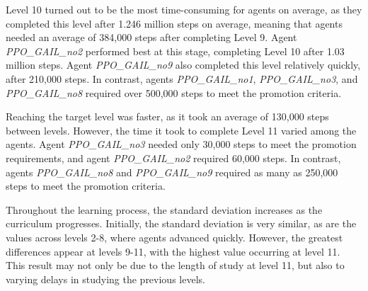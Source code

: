 Level 10 turned out to be the most time-consuming for agents on average, as they completed this level after 1.246 million steps on average, meaning that agents needed an average of 384,000 steps after completing Level 9. Agent \textit{PPO\_GAIL\_no2} performed best at this stage, completing Level 10 after 1.03 million steps. Agent \textit{PPO\_GAIL\_no9} also completed this level relatively quickly, after 210,000 steps. In contrast, agents \textit{PPO\_GAIL\_no1}, \textit{PPO\_GAIL\_no3}, and \textit{PPO\_GAIL\_no8} required over 500,000 steps to meet the promotion criteria.

Reaching the target level was faster, as it took an average of 130,000 steps between levels. However, the time it took to complete Level 11 varied among the agents. Agent \textit{PPO\_GAIL\_no3} needed only 30,000 steps to meet the promotion requirements, and agent \textit{PPO\_GAIL\_no2} required 60,000 steps. In contrast, agents \textit{PPO\_GAIL\_no8} and \textit{PPO\_GAIL\_no9} required as many as 250,000 steps to meet the promotion criteria.

Throughout the learning process, the standard deviation increases as the curriculum progresses. Initially, the standard deviation is very similar, as are the values across levels 2-8, where agents advanced quickly. However, the greatest differences appear at levels 9-11, with the highest value occurring at level 11. This result may not only be due to the length of study at level 11, but also to varying delays in studying the previous levels.

